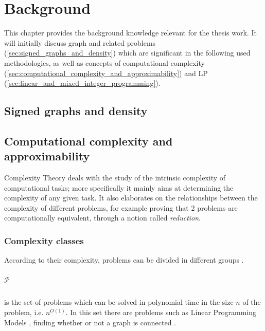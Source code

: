 \chapter{Background}
\label{ch:background}

This chapter provides the background knowledge relevant for the thesis work. It
will initially discuss graph and related problems (\autoref{sec:signed_graphs_and_density}) which are significant in the
following used methodologies, as well as concepts of computational complexity
(\autoref{sec:computational_complexity_and_approximability}) and \acrlong{LP} (\autoref{sec:linear_and_mixed_integer_programming}).

\section{Signed graphs and density}%
\label{sec:signed_graphs_and_density}

\section{Computational complexity and \\approximability}%
\label{sec:computational_complexity_and_approximability}

Complexity Theory deals with the study of the intrinsic complexity of
computational tasks; more specifically it mainly aims at determining the
complexity of any given task. It also elaborates on the relationships between
the complexity of different problems, for example proving that 2 problems are
computationally equivalent\cite{9780521884730}, through a notion called
\emph{reduction}.

\subsection{Complexity classes}%
\label{par:complexity_classes}

According to their complexity, problems can be divided in different groups
\cite{DemaineFall2014}.

\paragraph{$\mathcal{P} $}%
\label{par:p}
is the set of problems which can be solved in polynomial time in the size $n$ of
the problem, i.e. $n^{O(1)} $. In this set there are problems such as Linear
Programming Models \cite{KHACHIYAN198053}\cite{Karmarkar1984}, finding whether
or not a graph is connected \cite{9780521884730}.

